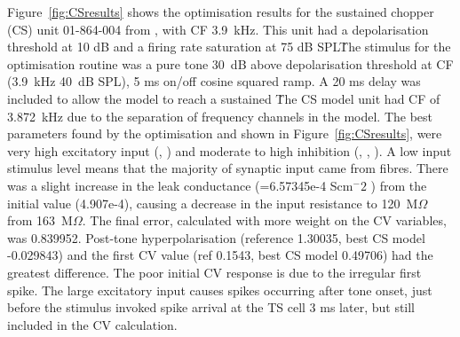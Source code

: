 Figure~\ref{fig:CSresults} shows the optimisation results for the sustained chopper (CS) unit 01-864-004 from \citep{PaoliniClareyEtAl:2005}, with CF 3.9~kHz.
This unit had a depolarisation threshold at 10 dB and a firing rate saturation at 75 dB SPL\.
The stimulus for the optimisation routine was a pure tone 30~dB above depolarisation threshold at CF (3.9~kHz 40~dB SPL), 5 ms on/off cosine squared ramp.
A 20 ms delay was included to allow the model to reach a sustained \RMP\. The CS model unit had CF of 3.872~kHz due to the separation of frequency channels in the model.
The best parameters found by the optimisation and shown in Figure~\ref{fig:CSresults}, were very high excitatory input (, ) and moderate to high inhibition (, , ).
A low input stimulus level means that the majority of synaptic input came from \HSR fibres.
There was a slight increase in the leak conductance (\gleak=6.57345e-4 Scm$^-2$ ) from the initial value (4.907e-4), causing a decrease in the input resistance to 120~M$\Omega$ from 163~M$\Omega$.
The final error, calculated with more weight on the CV variables, was 0.839952.
Post-tone hyperpolarisation (reference 1.30035, best CS model -0.029843) and the first CV value (ref 0.1543, best CS model 0.49706) had the greatest difference.
The poor initial CV response is due to the irregular first spike.
The large excitatory \HSR input causes spikes occurring after tone onset, just before the stimulus invoked spike arrival at the TS cell 3 ms later, but still included in the CV calculation.



